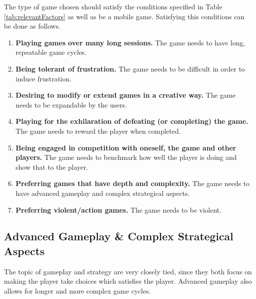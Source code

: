 The type of game chosen should satisfy the conditions specified in Table \ref{tab:relevantFactors} as well as be a mobile game.
Satisfying this conditions can be done as follows.
\begin{enumerate}\label{gamedesign:selectionofgametype:importantstuff}
\item \textbf{Playing games over many long sessions.} The game needs to have long, repeatable game cycles.
\item \textbf{Being tolerant of frustration.} The game needs to be difficult in order to induce frustration.
\item \textbf{Desiring to modify or extend games in a creative way.} The game needs to be expandable by the users.
\item \textbf{Playing for the exhilaration of defeating (or completing) the game.} The game needs to reward the player when completed.
\item \textbf{Being engaged in competition with oneself, the game and other players.} The game needs to benchmark how well the player is doing and show that to the player.
\item \textbf{Preferring games that have depth and complexity.} The game needs to have advanced gameplay and complex strategical aspects.
\item \textbf{Preferring violent/action games.} The game needs to be violent.
\end{enumerate}

\subsection{Advanced Gameplay \& Complex Strategical Aspects}
The topic of gameplay and strategy are very closely tied, since they both focus on making the player take choices which satisfies the player.
Advanced gameplay also allows for longer and more complex game cycles.

